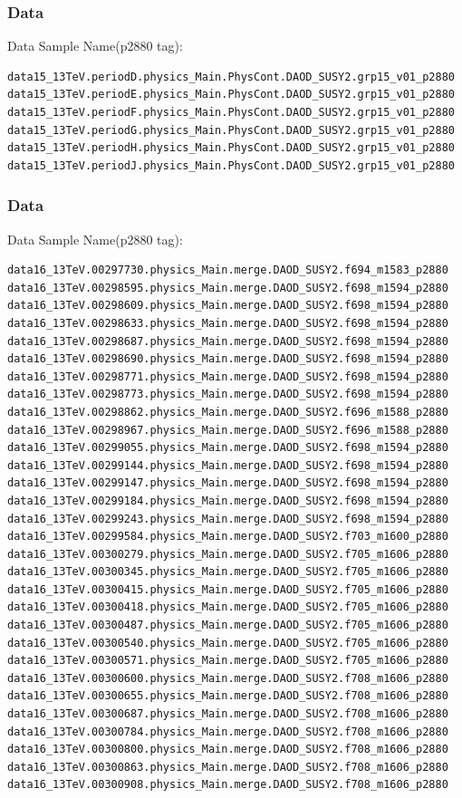 \documentclass[mathserif,serif]{beamer}
\begin{document}
\begin{frame}[fragile]
\frametitle{Data}
\small
Data Sample Name(p2880 tag):
\tiny
\begin{verbatim}
data15_13TeV.periodD.physics_Main.PhysCont.DAOD_SUSY2.grp15_v01_p2880
data15_13TeV.periodE.physics_Main.PhysCont.DAOD_SUSY2.grp15_v01_p2880
data15_13TeV.periodF.physics_Main.PhysCont.DAOD_SUSY2.grp15_v01_p2880
data15_13TeV.periodG.physics_Main.PhysCont.DAOD_SUSY2.grp15_v01_p2880
data15_13TeV.periodH.physics_Main.PhysCont.DAOD_SUSY2.grp15_v01_p2880
data15_13TeV.periodJ.physics_Main.PhysCont.DAOD_SUSY2.grp15_v01_p2880
\end{verbatim}
\end{frame}

\begin{frame}[fragile]
\frametitle{Data}
\small
Data Sample Name(p2880 tag):
\tiny
\begin{verbatim}
data16_13TeV.00297730.physics_Main.merge.DAOD_SUSY2.f694_m1583_p2880
data16_13TeV.00298595.physics_Main.merge.DAOD_SUSY2.f698_m1594_p2880
data16_13TeV.00298609.physics_Main.merge.DAOD_SUSY2.f698_m1594_p2880
data16_13TeV.00298633.physics_Main.merge.DAOD_SUSY2.f698_m1594_p2880
data16_13TeV.00298687.physics_Main.merge.DAOD_SUSY2.f698_m1594_p2880
data16_13TeV.00298690.physics_Main.merge.DAOD_SUSY2.f698_m1594_p2880
data16_13TeV.00298771.physics_Main.merge.DAOD_SUSY2.f698_m1594_p2880
data16_13TeV.00298773.physics_Main.merge.DAOD_SUSY2.f698_m1594_p2880
data16_13TeV.00298862.physics_Main.merge.DAOD_SUSY2.f696_m1588_p2880
data16_13TeV.00298967.physics_Main.merge.DAOD_SUSY2.f696_m1588_p2880
data16_13TeV.00299055.physics_Main.merge.DAOD_SUSY2.f698_m1594_p2880
data16_13TeV.00299144.physics_Main.merge.DAOD_SUSY2.f698_m1594_p2880
data16_13TeV.00299147.physics_Main.merge.DAOD_SUSY2.f698_m1594_p2880
data16_13TeV.00299184.physics_Main.merge.DAOD_SUSY2.f698_m1594_p2880
data16_13TeV.00299243.physics_Main.merge.DAOD_SUSY2.f698_m1594_p2880
data16_13TeV.00299584.physics_Main.merge.DAOD_SUSY2.f703_m1600_p2880
data16_13TeV.00300279.physics_Main.merge.DAOD_SUSY2.f705_m1606_p2880
data16_13TeV.00300345.physics_Main.merge.DAOD_SUSY2.f705_m1606_p2880
data16_13TeV.00300415.physics_Main.merge.DAOD_SUSY2.f705_m1606_p2880
data16_13TeV.00300418.physics_Main.merge.DAOD_SUSY2.f705_m1606_p2880
data16_13TeV.00300487.physics_Main.merge.DAOD_SUSY2.f705_m1606_p2880
data16_13TeV.00300540.physics_Main.merge.DAOD_SUSY2.f705_m1606_p2880
data16_13TeV.00300571.physics_Main.merge.DAOD_SUSY2.f705_m1606_p2880
data16_13TeV.00300600.physics_Main.merge.DAOD_SUSY2.f708_m1606_p2880
data16_13TeV.00300655.physics_Main.merge.DAOD_SUSY2.f708_m1606_p2880
data16_13TeV.00300687.physics_Main.merge.DAOD_SUSY2.f708_m1606_p2880
data16_13TeV.00300784.physics_Main.merge.DAOD_SUSY2.f708_m1606_p2880
data16_13TeV.00300800.physics_Main.merge.DAOD_SUSY2.f708_m1606_p2880
data16_13TeV.00300863.physics_Main.merge.DAOD_SUSY2.f708_m1606_p2880
data16_13TeV.00300908.physics_Main.merge.DAOD_SUSY2.f708_m1606_p2880
\end{verbatim}
\end{frame}
\end{document}
